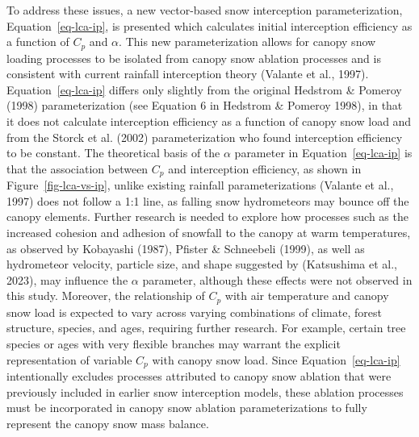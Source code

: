 \documentclass[
  letterpaper,
  DIV=11,
  numbers=noendperiod]{scrartcl}
\begin{document}
To address these issues, a new vector-based snow interception
parameterization, Equation~\ref{eq-lca-ip}, is presented which
calculates initial interception efficiency as a function of \(C_p\) and
\(\alpha\). This new parameterization allows for canopy snow loading
processes to be isolated from canopy snow ablation processes and is
consistent with current rainfall interception theory (Valante et al.,
1997). Equation~\ref{eq-lca-ip} differs only slightly from the original
Hedstrom \& Pomeroy (1998) parameterization (see Equation 6 in Hedstrom
\& Pomeroy 1998), in that it does not calculate interception efficiency
as a function of canopy snow load and from the Storck et al. (2002)
parameterization who found interception efficiency to be constant. The
theoretical basis of the \(\alpha\) parameter in
Equation~\ref{eq-lca-ip} is that the association between \(C_p\) and
interception efficiency, as shown in Figure~\ref{fig-lca-vs-ip}, unlike
existing rainfall parameterizations (Valante et al., 1997) does not
follow a 1:1 line, as falling snow hydrometeors may bounce off the
canopy elements. Further research is needed to explore how processes
such as the increased cohesion and adhesion of snowfall to the canopy at
warm temperatures, as observed by Kobayashi (1987), Pfister \&
Schneebeli (1999), as well as hydrometeor velocity, particle size, and
shape suggested by (Katsushima et al., 2023), may influence the
\(\alpha\) parameter, although these effects were not observed in this
study. Moreover, the relationship of \(C_p\) with air temperature and
canopy snow load is expected to vary across varying combinations of
climate, forest structure, species, and ages, requiring further
research. For example, certain tree species or ages with very flexible
branches may warrant the explicit representation of variable \(C_p\)
with canopy snow load. Since Equation~\ref{eq-lca-ip} intentionally
excludes processes attributed to canopy snow ablation that were
previously included in earlier snow interception models, these ablation
processes must be incorporated in canopy snow ablation parameterizations
to fully represent the canopy snow mass balance.
\end{document}
